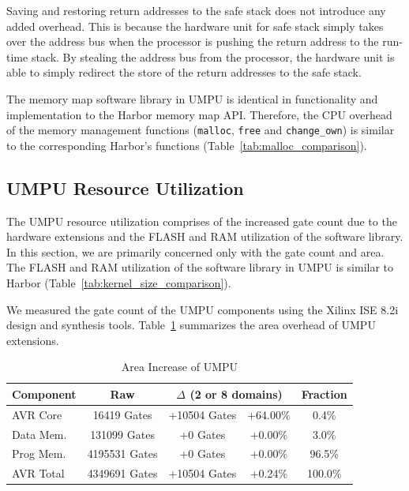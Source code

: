Saving and restoring return addresses to the safe stack does not
introduce any added overhead.
%
This is because the hardware unit for safe stack simply takes over the
address bus when the processor is pushing the return address to the
run-time stack.
%
By stealing the address bus from the processor, the hardware unit is
able to simply redirect the store of the return addresses to the safe
stack.

The memory map software library in UMPU is identical in functionality
and implementation to the Harbor memory map API.
%
Therefore, the CPU overhead of the memory management functions (\texttt{malloc},
\texttt{free} and \texttt{change\_own}) is similar to the corresponding
Harbor's functions (Table~\ref{tab:malloc_comparison}).
%
\subsection{UMPU Resource Utilization}
%
The UMPU resource utilization comprises of the increased gate count
due to the hardware extensions and the FLASH and RAM utilization of
the software library.
%
In this section, we are primarily concerned only with the gate count
and area.
%
The FLASH and RAM utilization of the software library in UMPU is
similar to Harbor (Table~\ref{tab:kernel_size_comparison}).



%
We measured the gate count of the UMPU components using the Xilinx ISE
8.2i~\cite{xilinxlink} design and synthesis tools.
%
Table~\ref{tab:umpuarea} summarizes the area overhead of UMPU extensions.
% 
\begin{table}[htdp]
\centering
\small{\def\X{\hphantom{0}}\def\XX{\X\X}\def\XXX{\XX\X}\def\Y{\raise1pt\hbox{\strut}}
\begin{tabular}{|l|c|c|c|c|}
	\hline
	Component & Raw & \multicolumn{2}{c|}{$\Delta$ (2 or 8 domains)} & Fraction \\
	\hline
	AVR Core   & \XX{}16419 Gates &   +10504 Gates & +64.00\% &\XX{}0.4\%\\
	Data Mem.  & \X{}131099 Gates & \XXX{}+0 Gates &  +0.00\% &\XX{}3.0\%\\
        Prog Mem.  &    4195531 Gates & \XXX{}+0 Gates &  +0.00\% & \X{}96.5\%\\
        AVR Total  &    4349691 Gates &   +10504 Gates &  +0.24\% &   100.0\%\\   
	\hline
\end{tabular}}
\caption{Area Increase of UMPU}
\label{tab:umpuarea}
\end{table}

